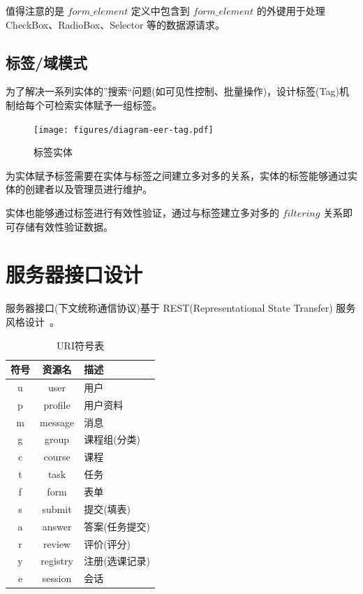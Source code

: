 值得注意的是 $form\_element$ 定义中包含到 $form\_element$ 的外键用于处理 CheckBox、RadioBox、Selector 等的数据源请求。

\subsection{标签/域模式}

为了解决一系列实体的”搜索“问题(如可见性控制、批量操作)，设计标签(Tag)机制给每个可检索实体赋予一组标签。

\begin{figure}[!h]
  \begin{center}
    \texttt{[image: figures/diagram-eer-tag.pdf]}
    \caption{标签实体\label{DatabaseEntityTag}}
  \end{center}
\end{figure}

为实体赋予标签需要在实体与标签之间建立多对多的关系，实体的标签能够通过实体的创建者以及管理员进行维护。

实体也能够通过标签进行有效性验证，通过与标签建立多对多的 $filtering$ 关系即可存储有效性验证数据。

\newpage

\section{服务器接口设计\label{sec:ServerAPI}}

服务器接口(下文统称通信协议)基于 REST(Representational State Transfer) 服务风格设计~\cite{fielding2002principled}。

\begin{table}[!h]
  \begin{center}
    \noindent
    \ttfamily
    \begin{tabular}{|c|c|l|}
      \hline
      \textbf{符号} & \textbf{资源名} & \textbf{描述} \\ \hline
      u & user      & 用户          \\ \hline
      p & profile   & 用户资料      \\ \hline
      m & message   & 消息          \\ \hline
      g & group     & 课程组(分类)  \\ \hline
      c & course    & 课程          \\ \hline
      t & task      & 任务          \\ \hline
      f & form      & 表单          \\ \hline
      s & submit    & 提交(填表)    \\ \hline
      a & answer    & 答案(任务提交)\\ \hline
      r & review    & 评价(评分)    \\ \hline
      y & registry  & 注册(选课记录)\\ \hline
      e & session   & 会话          \\ \hline
    \end{tabular}
    \caption{URI符号表\label{APURIGlossary}}
  \end{center}
\end{table}

